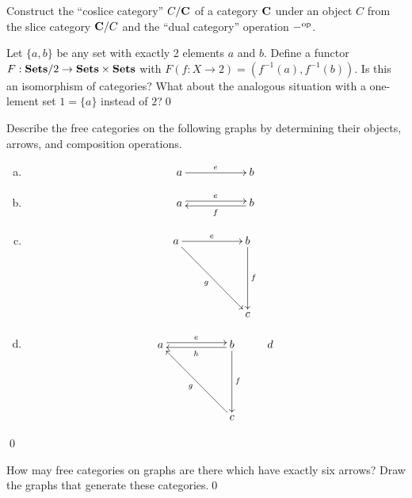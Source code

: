 \begin{problem} 
  Construct the ``coslice category'' \(C/\mathbf{{C}}\) of a category \(\mathbf{{C}}\) under an
  object \(C\) from the slice category \(\mathbf{{C}}/C\) and the ``dual category''
  operation \(-^{\textnormal{op}}\).
\end{problem}

\begin{problem}
  Let \(\{a,b\}\) be any set with exactly 2 elements \(a\) and \(b\). Define a
  functor \(F:\mathbf{{Sets}} / 2 \to \mathbf{{Sets}} \times \mathbf{{Sets}}\) with \(F(f : X \to 2) =
  (f^{-1}(a), f^{-1}(b))\). Is this an isomorphism of categories? What about the
  analogous situation with a one-lement set \(1 = \{a\}\) instead of
  \(2\)?\qed{}
\end{problem}

\setcounter{problem}{8}
\begin{problem}
  Describe the free categories on the following graphs by determining their
  objects, arrows, and composition operations.
  \begin{enumerate}[(a)]
    \item
      \begin{equation*}
        \xymatrix{ a \ar[rr]^e && b }
      \end{equation*}

    \item
      \begin{equation*}
        \xymatrix{a\ar@<0.5ex>[rr]^e && b\ar@<0.5ex>[ll]^f}
      \end{equation*}

    \item 
      \begin{equation*}
        \xymatrix{a \ar[rr]^e\ar[ddrr]_g && b\ar[dd]^f \\ && \\ && c}
      \end{equation*}

    \item 
      \begin{equation*}
        \xymatrix{
          a \ar@<0.5ex>[rr]^e && b\ar@<0.5ex>[ll]^h\ar[dd]^f & d\\ 
          && &\\
                              && c \ar[uull]^g & }
      \end{equation*}
  \end{enumerate}\qed{}
\end{problem}


\begin{problem}
  How may free categories on graphs are there which have exactly six arrows?
  Draw the graphs that generate these categories.\qed{}
\end{problem}



